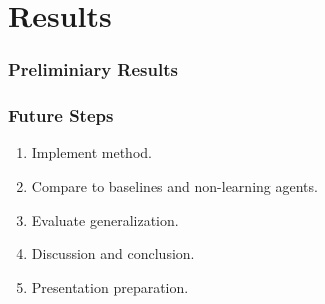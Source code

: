 \section{Results}

\begin{frame}
    \frametitle{Preliminiary Results}
\end{frame}

\begin{frame}
    \frametitle{Future Steps}

    \begin{enumerate}
        \item Implement method.
        \item Compare to baselines and non-learning agents.
        \item Evaluate generalization.
        \item Discussion and conclusion.
        \item Presentation preparation.
    \end{enumerate}
\end{frame}
